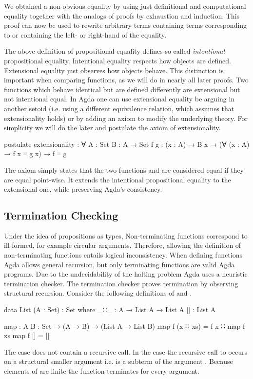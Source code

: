 We obtained a non-obvious equality by using just definitional and computational
equality together with the analogs of proofs by exhaustion and induction.
This proof can now be used to rewrite arbitrary terms containing terms
corresponding to or containing the left- or right-hand of the equality.

The above definition of propositional equality defines so called
\textit{intentional} propositional equality.
Intentional equality respects how objects are defined.
Extensional equality just observes how objects behave.
This distinction is important when comparing functions, as we will do in nearly
all later proofs.
Two functions which behave identical but are defined differently are
extensional but not intentional equal.
In Agda one can use extensional equality be arguing in another setoid (i.e.
using a different equivalence relation, which assumes that extensionality holds)
or by adding an axiom to modify the underlying theory.
For simplicity we will do the later and postulate the axiom of extensionality.

\begin{code}
postulate
  extensionality : ∀ {A : Set} {B : A → Set} 
    {f g : (x : A) → B x} → (∀ (x : A) → f x ≡ g x) → f ≡ g
\end{code}
The axiom simply states that the two functions  and
 are considered equal if they are equal point-wise.
It extends the intentional propositional equality to the extensional one, while
preserving Agda's consistency.


\subsection{Termination Checking}
\label{sec:termination-checking}

Under the idea of propositions as types, Non-terminating functions correspond to
ill-formed, for example circular arguments. %
Therefore, allowing the definition of non-terminating functions entails logical
inconsistency.
When defining functions Agda allows general recursion, but only terminating
functions are valid Agda programs.
Due to the undecidability of the halting problem Agda uses a heuristic
termination checker.
The termination checker proves termination by observing structural recursion.
Consider the following definitions of  and
.

\begin{code}
data List (A : Set) : Set where
  _∷_  : A → List A → List A
  []   : List A

map : {A B : Set} → (A → B) → (List A → List B)
map f (x ∷ xs)  = f x ∷ map f xs
map f []        = []
\end{code}
The \AgdaInductiveConstructor{[]} case does not contain a recursive call.
In the  case the recursive call to
 occurs on a structural smaller argument i.e.
 is a subterm of the argument
\;\;.
Because elements of  are finite the function
 terminates for every argument.


